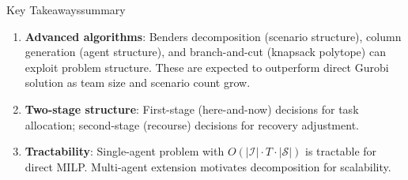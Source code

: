 \documentclass[11pt,a4paper]{article}
\begin{document}
\begin{keyconcept}{Key Takeaways}{summary}
\begin{enumerate}
    \item \textbf{Advanced algorithms}: Benders decomposition (scenario structure), column generation (agent structure), and branch-and-cut (knapsack polytope) can exploit problem structure. These are expected to outperform direct Gurobi solution as team size and scenario count grow.
    
    \item \textbf{Two-stage structure}: First-stage (here-and-now) decisions for task allocation; second-stage (recourse) decisions for recovery adjustment.
    
    \item \textbf{Tractability}: Single-agent problem with $O(|\mathcal{I}| \cdot T \cdot |\mathcal{S}|)$ is tractable for direct MILP. Multi-agent extension motivates decomposition for scalability.
\end{enumerate}
\end{keyconcept}
\end{document}
